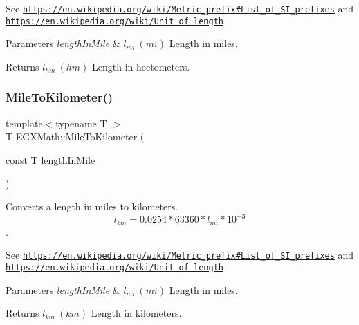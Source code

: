 See \href{https://en.wikipedia.org/wiki/Metric_prefix#List_of_SI_prefixes}{\tt https\+://en.\+wikipedia.\+org/wiki/\+Metric\+\_\+prefix\#\+List\+\_\+of\+\_\+\+S\+I\+\_\+prefixes} and \href{https://en.wikipedia.org/wiki/Unit_of_length}{\tt https\+://en.\+wikipedia.\+org/wiki/\+Unit\+\_\+of\+\_\+length} 
\begin{DoxyParams}{Parameters}
{\em length\+In\+Mile} & $ l_{mi}\ (mi)$ Length in miles. \\
\hline
\end{DoxyParams}
\begin{DoxyReturn}{Returns}
$ l_{hm}\ (hm)$ Length in hectometers. 
\end{DoxyReturn}
\mbox{\label{group___e_g_x_math-_conversions-_length_conversions-_imperial-_mile-_s_i_ga426c0a7ef1e87648941729c5447f0b07}} 
\subsubsection{\texorpdfstring{Mile\+To\+Kilometer()}{MileToKilometer()}}
{\footnotesize\ttfamily template$<$typename T $>$ \\
T E\+G\+X\+Math\+::\+Mile\+To\+Kilometer (\begin{DoxyParamCaption}\item[{const T}]{length\+In\+Mile }\end{DoxyParamCaption})}



Converts a length in miles to kilometers. \[ l_{km}=0.0254 * 63360 * l_{mi} * 10^{-3} \]. 

See \href{https://en.wikipedia.org/wiki/Metric_prefix#List_of_SI_prefixes}{\tt https\+://en.\+wikipedia.\+org/wiki/\+Metric\+\_\+prefix\#\+List\+\_\+of\+\_\+\+S\+I\+\_\+prefixes} and \href{https://en.wikipedia.org/wiki/Unit_of_length}{\tt https\+://en.\+wikipedia.\+org/wiki/\+Unit\+\_\+of\+\_\+length} 
\begin{DoxyParams}{Parameters}
{\em length\+In\+Mile} & $ l_{mi}\ (mi)$ Length in miles. \\
\hline
\end{DoxyParams}
\begin{DoxyReturn}{Returns}
$ l_{km}\ (km)$ Length in kilometers. 
\end{DoxyReturn}
\mbox{\label{group___e_g_x_math-_conversions-_length_conversions-_imperial-_mile-_s_i_ga3b369ccb3f0fc38098abdba01110910b}} 
